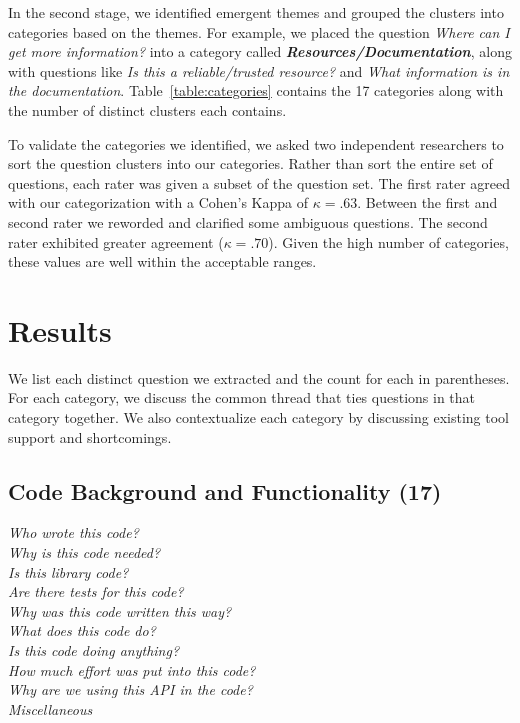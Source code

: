\documentclass[conference]{IEEEtran}
\begin{document}
In the second stage, we identified emergent themes and grouped the clusters into categories based on the themes. 
For example, we placed the question \textit{Where can I get more information?} into a category called \emph{\textbf{Resources/Documentation}}, along with questions like \textit{Is this a reliable/trusted resource?} and \textit{What information is in the documentation}. 
Table~\ref{table:categories} contains the 17 categories along with the number of distinct clusters each contains. 

To validate the categories we identified, we asked two independent researchers to sort the question clusters into our categories. 
Rather than sort the entire set of questions, each rater was given a subset of the question set. 
The first rater agreed with our categorization with a Cohen's Kappa of $\kappa = .63$. 
Between the first and second rater we reworded and clarified some ambiguous questions. The second rater exhibited greater agreement ($\kappa = .70$). 
Given the high number of categories, these values are well within the acceptable ranges.

\section{Results}
\label{sec:results}
We list each distinct question we extracted and the count for each in parentheses. For each category, we discuss the common thread that ties questions in that category together. We also contextualize each category by discussing existing tool support and shortcomings.



\noindent\subsection{\textbf{Code Background and Functionality (17)}}
\label{cbf}

\noindent\emph{Who wrote this code?} \\
\emph{Why is this code needed?} \\
\emph{Is this library code?} \\
\emph{Are there tests for this code?} \\
\emph{Why was this code written this way?} \\
\emph{What does this code do?} \\
\emph{Is this code doing anything?} \\
\emph{How much effort was put into this code?} \\
\emph{Why are we using this API in the code?} \\
\emph{Miscellaneous} \\
\end{document}
